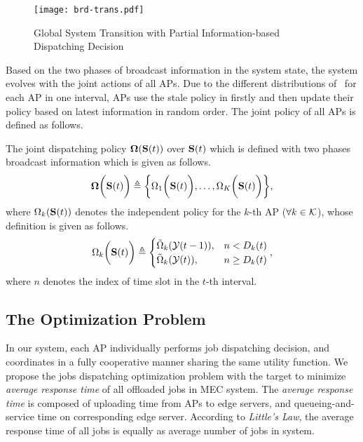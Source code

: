 \begin{figure}[ht]
    \centering
    \texttt{[image: brd-trans.pdf]}
    \caption{Global System Transition with Partial Information-based Dispatching Decision}
    \label{fig:brd-trans}
\end{figure}

Based on the two phases of broadcast information in the system state, the system evolves with the joint actions of all APs.
Due to the different distributions of \brdelay~for each AP in one interval, APs use the stale policy in firstly and then update their policy based on latest information in random order.
The joint policy of all APs is defined as follows.
\begin{definition}
    The joint dispatching policy $\boldsymbol{\Omega}(\mathbf{S}({t}))$ over $\mathbf{S}({t})$ which is defined with two phases broadcast information which is given as follows.
    \begin{align}
        \boldsymbol{\Omega}\bigg(\mathbf{S}({t})\bigg) \triangleq \bigg\{
            \Omega_{1}\bigg(\mathbf{S}({t})\bigg), \dots, \Omega_{K}\bigg(\mathbf{S}({t})\bigg)
        \bigg\},
    \end{align}
    where
    $\Omega_{k}(\mathbf{S}({t}))$ denotes the independent policy for the $k$-th AP ($\forall k\in\mathcal{K}$), whose definition is given as follows.
    \begin{align}
        \Omega_{k}\bigg(\mathbf{S}({t})\bigg) \triangleq
        \begin{cases}
            \tilde{\Omega}_{k}( \mathcal{Y}({t-1}) ), &n <    D_{k}({t})
            \\
            \tilde{\Omega}_{k}( \mathcal{Y}({t}) ),   &n \geq D_{k}({t})
        \end{cases},
    \end{align}
    where $n$ denotes the index of time slot in the $t$-th interval.
\end{definition}

\subsection{The Optimization Problem}
In our system, each AP individually performs job dispatching decision, and coordinates in a fully cooperative manner sharing the same utility function.
We propose the jobs dispatching optimization problem with the target to minimize \emph{average response time} of all offloaded jobs in MEC system.
The \emph{average response time} is composed of uploading time from APs to edge servers, and queueing-and-service time on corresponding edge server. According to \emph{Little's Law}, the average response time of all jobs is equally as average number of jobs in system.

